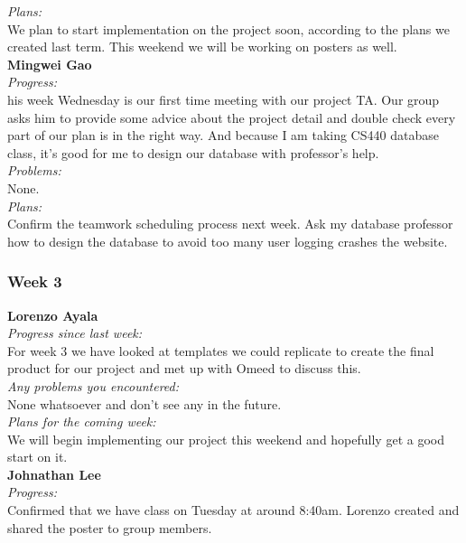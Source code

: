 \noindent\textit{Plans:}\\
\noindent We plan to start implementation on the project soon, according to the plans we created last term. This weekend we will be working on posters as well.\\

\noindent\textbf{Mingwei Gao}\\
\noindent\textit{Progress:}\\
his week Wednesday is our first time meeting with our project TA. Our group asks him to provide some advice about the project detail and double check every part of our plan is in the right way. And because I am taking CS440 database class, it's good for me to design our database with professor's help.\\

\noindent\textit{Problems:}\\
\noindent None.\\

\noindent\textit{Plans:}\\
\noindent Confirm the teamwork scheduling process next week. Ask my database professor how to design the database to avoid too many user logging crashes the website.\\

\subsubsection{Week 3}

\textbf{Lorenzo Ayala}\\
\noindent\textit{Progress since last week:}\\
For week 3 we have looked at templates we could replicate to create the final product for our project and met up with Omeed to discuss this. \\

\noindent\textit{Any problems you encountered:}\\
\noindent None whatsoever and don't see any in the future.\\

\noindent\textit{Plans for the coming week:}\\
\noindent We will begin implementing our project this weekend and hopefully get a good start on it. \\

\noindent\textbf{Johnathan Lee}\\
\noindent\textit{Progress:}\\
Confirmed that we have class on Tuesday at around 8:40am. Lorenzo created and shared the poster to group members. \\ 

